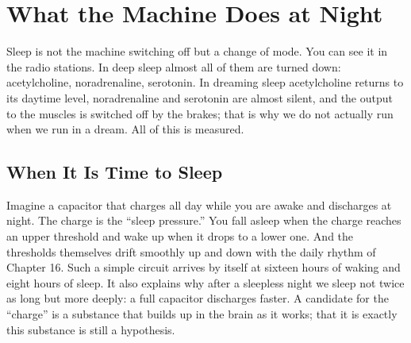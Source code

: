 \chapter{What the Machine Does at Night}

Sleep is not the machine switching off but a change of mode. You can see it in the radio stations. In deep sleep almost all of them are turned down: acetylcholine, noradrenaline, serotonin. In dreaming sleep acetylcholine returns to its daytime level, noradrenaline and serotonin are almost silent, and the output to the muscles is switched off by the brakes; that is why we do not actually run when we run in a dream. All of this is measured.

\section*{When It Is Time to Sleep}

Imagine a capacitor that charges all day while you are awake and discharges at night. The charge is the ``sleep pressure.'' You fall asleep when the charge reaches an upper threshold and wake up when it drops to a lower one. And the thresholds themselves drift smoothly up and down with the daily rhythm of Chapter 16. Such a simple circuit arrives by itself at sixteen hours of waking and eight hours of sleep. It also explains why after a sleepless night we sleep not twice as long but more deeply: a full capacitor discharges faster. A candidate for the ``charge'' is a substance that builds up in the brain as it works; that it is exactly this substance is still a hypothesis.


